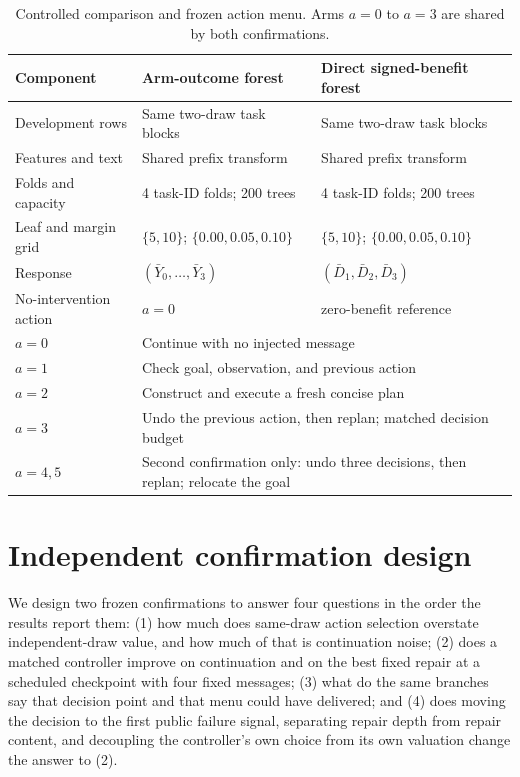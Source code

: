 \begin{table}[t]
\caption{Controlled comparison and frozen action menu. Arms $a=0$ to $a=3$ are shared by both confirmations.}
\label{tab:design}
\centering
\small
\begin{tabular}{@{}lll@{}}
\toprule
Component & Arm-outcome forest & Direct signed-benefit forest \\
\midrule
Development rows & Same two-draw task blocks & Same two-draw task blocks \\
Features and text & Shared prefix transform & Shared prefix transform \\
Folds and capacity & 4 task-ID folds; 200 trees & 4 task-ID folds; 200 trees \\
Leaf and margin grid & $\{5,10\}$; $\{0.00,0.05,0.10\}$ & $\{5,10\}$; $\{0.00,0.05,0.10\}$ \\
Response & $(\bar Y_0,\ldots,\bar Y_3)$ & $(\bar D_1,\bar D_2,\bar D_3)$ \\
No-intervention action & $a=0$ & zero-benefit reference \\
\midrule
$a=0$ & \multicolumn{2}{l}{Continue with no injected message} \\
$a=1$ & \multicolumn{2}{l}{Check goal, observation, and previous action} \\
$a=2$ & \multicolumn{2}{l}{Construct and execute a fresh concise plan} \\
$a=3$ & \multicolumn{2}{l}{Undo the previous action, then replan; matched decision budget} \\
$a=4,5$ & \multicolumn{2}{l}{Second confirmation only: undo three decisions, then replan; relocate the goal} \\
\bottomrule
\end{tabular}
\end{table}

\section{Independent confirmation design}
\label{sec:design}

We design two frozen confirmations to answer four questions in the order the results report them: (1) how much does same-draw action selection overstate independent-draw value, and how much of that is continuation noise; (2) does a matched controller improve on continuation and on the best fixed repair at a scheduled checkpoint with four fixed messages; (3) what do the same branches say that decision point and that menu could have delivered; and (4) does moving the decision to the first public failure signal, separating repair depth from repair content, and decoupling the controller's own choice from its own valuation change the answer to (2).

